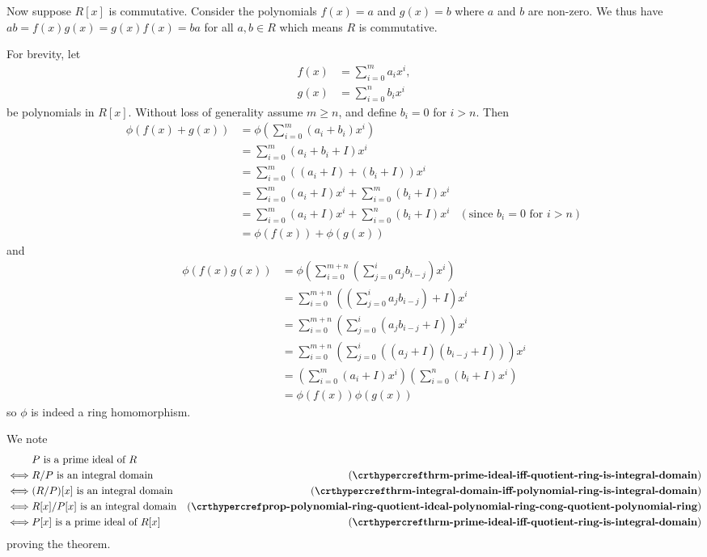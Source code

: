 \begin{questions}
\begin{partquestions}{\alph*}
        Now suppose $R[x]$ is commutative. Consider the polynomials $f(x) = a$ and $g(x) = b$ where $a$ and $b$ are non-zero. We thus have $ab = f(x)g(x) = g(x)f(x) = ba$ for all $a,b \in R$ which means $R$ is commutative.
    \end{partquestions}

    \item For brevity, let
    \begin{align*}
        f(x) &= \sum_{i=0}^ma_ix^i,\\
        g(x) &= \sum_{i=0}^nb_ix^i
    \end{align*}
    be polynomials in $R[x]$. Without loss of generality assume $m \geq n$, and define $b_i = 0$ for $i > n$. Then
    \begin{align*}
        \phi(f(x) + g(x)) &= \phi\left(\sum_{i=0}^m (a_i+b_i)x^i\right)\\
        &= \sum_{i=0}^m (a_i+b_i + I)x^i\\
        &= \sum_{i=0}^m ((a_i + I) + (b_i + I))x^i\\
        &= \sum_{i=0}^m (a_i + I)x^i + \sum_{i=0}^m (b_i + I)x^i\\
        &= \sum_{i=0}^m (a_i + I)x^i + \sum_{i=0}^n (b_i + I)x^i & (\text{since } b_i = 0\text{ for } i > n)\\
        &= \phi(f(x)) + \phi(g(x))
    \end{align*}
    and
    \begin{align*}
        \phi(f(x)g(x)) &= \phi\left(\sum_{i=0}^{m+n}\left(\sum_{j=0}^i a_jb_{i-j}\right)x^i\right)\\
        &= \sum_{i=0}^{m+n}\left(\left(\sum_{j=0}^i a_jb_{i-j}\right) + I\right)x^i\\
        &= \sum_{i=0}^{m+n}\left(\sum_{j=0}^i (a_jb_{i-j} + I)\right)x^i\\
        &= \sum_{i=0}^{m+n}\left(\sum_{j=0}^i ((a_j+I)(b_{i-j}+I))\right)x^i\\
        &= \left(\sum_{i=0}^m(a_i+I)x^i\right)\left(\sum_{i=0}^n(b_i+I)x^i\right)\\
        &= \phi(f(x))\phi(g(x))
    \end{align*}
    so $\phi$ is indeed a ring homomorphism.

    \item We note
    \begin{align*}
        &P \text{ is a prime ideal of }R\\
        \iff&R/P \text{ is an integral domain} & (\myref{thrm-prime-ideal-iff-quotient-ring-is-integral-domain})\\
        \iff&(R/P)[x] \text{ is an integral domain} & (\myref{thrm-integral-domain-iff-polynomial-ring-is-integral-domain})\\
        \iff&R[x]/P[x] \text{ is an integral domain} & (\myref{prop-polynomial-ring-quotient-ideal-polynomial-ring-cong-quotient-polynomial-ring})\\
        \iff&P[x]\text{ is a prime ideal of }R[x] & (\myref{thrm-prime-ideal-iff-quotient-ring-is-integral-domain})
    \end{align*}
    proving the theorem.
\end{questions}
